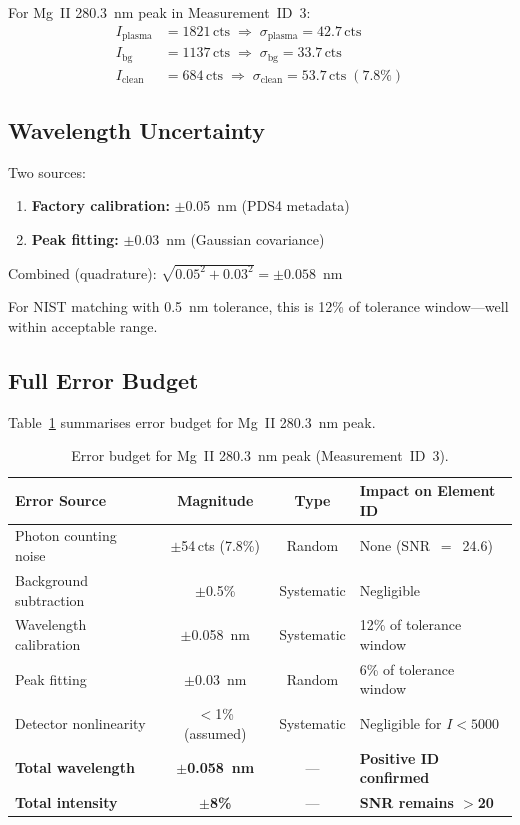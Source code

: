 \documentclass[a4paper,twocolumn,10pt]{article}
\begin{document}
For Mg~II 280.3~nm peak in Measurement~ID~3:
\begin{align}
I_{\text{plasma}} &= 1821\,\text{cts} \;\Rightarrow\;
  \sigma_{\text{plasma}} = 42.7\,\text{cts} \\
I_{\text{bg}} &= 1137\,\text{cts} \;\Rightarrow\;
  \sigma_{\text{bg}} = 33.7\,\text{cts} \\
I_{\text{clean}} &= 684\,\text{cts} \;\Rightarrow\;
  \sigma_{\text{clean}} = 53.7\,\text{cts}\;(7.8\%)
\end{align}

\subsection{Wavelength Uncertainty}

Two sources:
\begin{enumerate}[nosep,leftmargin=*]
  \item \textbf{Factory calibration:} $\pm$0.05~nm (PDS4 metadata)
  \item \textbf{Peak fitting:} $\pm$0.03~nm (Gaussian covariance)
\end{enumerate}

Combined (quadrature): $\sqrt{0.05^2 + 0.03^2} = \pm 0.058$~nm

For NIST matching with 0.5~nm tolerance, this is 12\% of tolerance
window---well within acceptable range.

\subsection{Full Error Budget}

Table~\ref{tab:error_budget} summarises error budget for Mg~II
280.3~nm peak.

\begin{table}[!t]
\centering
\caption{Error budget for Mg~II 280.3~nm peak (Measurement~ID~3).}
\label{tab:error_budget}
{\small
\begin{tabularx}{\textwidth}{@{}lccX@{}}
\toprule
\textbf{Error Source} & \textbf{Magnitude} & \textbf{Type} &
  \textbf{Impact on Element ID} \\
\midrule
Photon counting noise & $\pm$54\,cts (7.8\%) & Random &
  None (SNR~$=$~24.6) \\
Background subtraction & $\pm$0.5\% & Systematic & Negligible \\
Wavelength calibration & $\pm$0.058~nm & Systematic &
  12\% of tolerance window \\
Peak fitting & $\pm$0.03~nm & Random & 6\% of tolerance window \\
Detector nonlinearity & $<$1\% (assumed) & Systematic &
  Negligible for $I < 5000$ \\
\midrule
\textbf{Total wavelength} & \textbf{$\pm$0.058~nm} & --- &
  \textbf{Positive ID confirmed} \\
\textbf{Total intensity} & \textbf{$\pm$8\%} & --- &
  \textbf{SNR remains $>$20} \\
\bottomrule
\end{tabularx}
}
\end{table}
\end{document}
